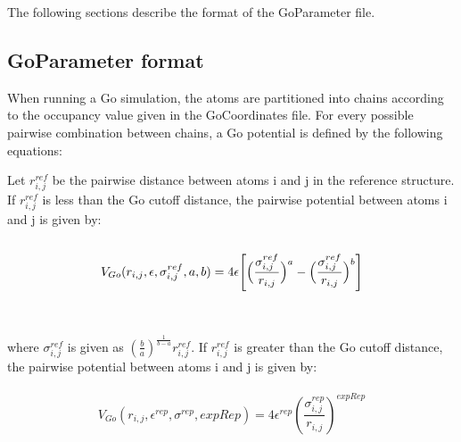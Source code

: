 The following sections describe the format of the GoParameter file.
\subsection{GoParameter format}

When running a Go simulation, the atoms are partitioned into chains according to the occupancy value given in the GoCoordinates file.
For every possible pairwise combination between chains, a Go potential is defined by the following equations:

Let $r^{ref}_{i,j}$ be the pairwise distance between atoms i and j in the reference structure.
If $r^{ref}_{i,j}$ is less than the Go cutoff distance, the pairwise potential between atoms i and j is given by: \\\\
$$V_{Go}(r_{i,j},\epsilon,\sigma^{ref}_{i,j},a,b)
 = 4 \epsilon \Biggl[ \Bigl( \frac{\sigma^{ref}_{i,j}} {r_{i,j}} \Bigr)^a
 - \Bigl( \frac{\sigma^{ref}_{i,j}} {r_{i,j}} \Bigr)^b \Biggr]$$ \\\\
where $\sigma^{ref}_{i,j}$ is given as $\left(\frac{b}{a}\right)^{\frac{1}{b-a}}r^{ref}_{i,j}$.
If $r^{ref}_{i,j}$ is greater than the Go cutoff distance, the pairwise potential between atoms i and j is given by: \\\\ 
$$V_{Go}(r_{i,j},\epsilon^{rep},\sigma^{rep},expRep) = 4 \epsilon^{rep} (\frac{\sigma^{rep}_{i,j}}{r_{i,j}})^{expRep}$$ 


